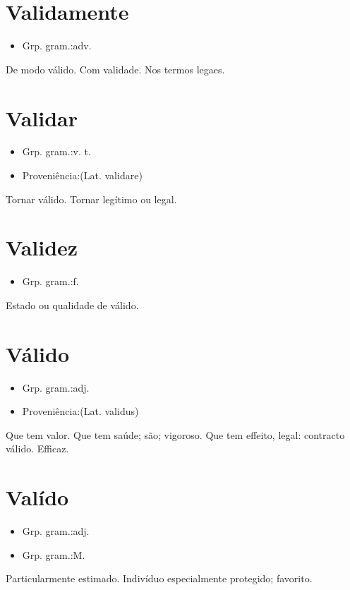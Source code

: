 \documentclass{article}
\begin{document}
\section{Validamente}
\begin{itemize}
\item {Grp. gram.:adv.}
\end{itemize}
De modo válido.
Com validade.
Nos termos legaes.
\section{Validar}
\begin{itemize}
\item {Grp. gram.:v. t.}
\end{itemize}
\begin{itemize}
\item {Proveniência:(Lat. \textunderscore validare\textunderscore )}
\end{itemize}
Tornar válido.
Tornar legítimo ou legal.
\section{Validez}
\begin{itemize}
\item {Grp. gram.:f.}
\end{itemize}
Estado ou qualidade de válido.
\section{Válido}
\begin{itemize}
\item {Grp. gram.:adj.}
\end{itemize}
\begin{itemize}
\item {Proveniência:(Lat. \textunderscore validus\textunderscore )}
\end{itemize}
Que tem valor.
Que tem saúde; são; vigoroso.
Que tem effeito, legal: \textunderscore contracto válido\textunderscore .
Efficaz.
\section{Valído}
\begin{itemize}
\item {Grp. gram.:adj.}
\end{itemize}
\begin{itemize}
\item {Grp. gram.:M.}
\end{itemize}
Particularmente estimado.
Indivíduo especialmente protegido; favorito.
\end{document}
